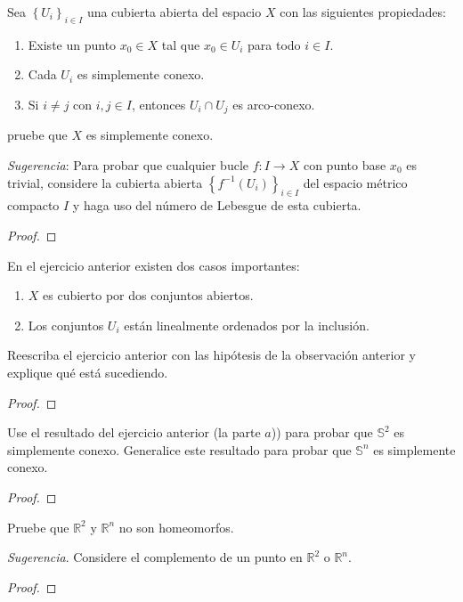 \documentclass[12pt]{report}
\theoremstyle{largebreak}
\newcommand\cf[3]{\ensuremath{#1:#2\rightarrow#3}}
\begin{document}
    \begin{excer}
        Sea $\left\{U_i \right\}_{ i\in I}$ una cubierta abierta del espacio $X$ con las siguientes propiedades:
        \renewcommand{\theenumi}{\alph{enumi}}
        \begin{enumerate}
            \item Existe un punto $x_0\in X$ tal que $x_0\in U_i$ para todo $i\in I$.
            \item Cada $U_i$ es simplemente conexo.
            \item Si $i\neq j$ con $i,j\in I$, entonces $U_i\cap U_j$ es arco-conexo. 
        \end{enumerate}
        pruebe que $X$ es simplemente conexo.
        
        \textit{Sugerencia}: Para probar que cualquier bucle $\cf{f}{I}{X}$ con punto base $x_0$ es trivial, considere la cubierta abierta $\left\{f^{-1}(U_i) \right\}_{ i\in I}$ del espacio métrico compacto $I$ y haga uso del número de Lebesgue de esta cubierta.
    \end{excer}

    \begin{proof}
        
    \end{proof}

    \begin{obs}
        En el ejercicio anterior existen dos casos importantes:
        \begin{enumerate}
            \item $X$ es cubierto por dos conjuntos abiertos.
            \item Los conjuntos $U_i$ están linealmente ordenados por la inclusión.
        \end{enumerate}
    \end{obs}

    \begin{excer}
        Reescriba el ejercicio anterior con las hipótesis de la observación anterior y explique qué está sucediendo.
    \end{excer}

    \begin{proof}
        
    \end{proof}

    \begin{excer}
        Use el resultado del ejercicio anterior (la parte $a$)) para probar que $\mathbb{S}^2$ es simplemente conexo. Generalice este resultado para probar que $\mathbb{S}^n$ es simplemente conexo.
    \end{excer}

    \begin{proof}
        
    \end{proof}

    \begin{excer}
        Pruebe que $\mathbb{R}^2$ y $\mathbb{R}^n$ no son homeomorfos.

        \textit{Sugerencia}. Considere el complemento de un punto en $\mathbb{R}^2$ o $\mathbb{R}^n$.
    \end{excer}

    \begin{proof}
        
    \end{proof}
\end{document}
